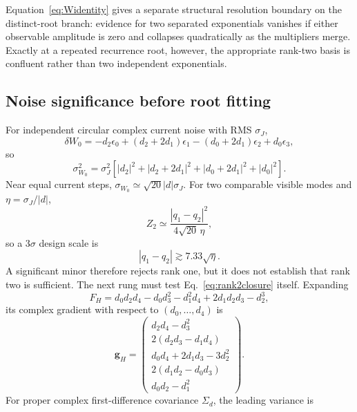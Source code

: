 \documentclass[11pt]{article}
\begin{document}
Equation~\eqref{eq:Widentity} gives a separate structural resolution boundary on the distinct-root branch: evidence for two separated exponentials vanishes if either observable amplitude is zero and collapses quadratically as the multipliers merge. Exactly at a repeated recurrence root, however, the appropriate rank-two basis is confluent rather than two independent exponentials.

\subsection{Noise significance before root fitting}

For independent circular complex current noise with RMS $\sigma_J$,
\begin{equation}
\delta W_0
=-d_2\epsilon_0+(d_2+2d_1)\epsilon_1
-(d_0+2d_1)\epsilon_2+d_0\epsilon_3,
\end{equation}
so
\begin{equation}
\boxed{
\sigma_{W_0}^2=\sigma_J^2\left[
|d_2|^2+|d_2+2d_1|^2+|d_0+2d_1|^2+|d_0|^2
\right].}
\label{eq:Wnoise}
\end{equation}
Near equal current steps, $\sigma_{W_0}\simeq\sqrt{20}|d|\sigma_J$. For two comparable visible modes and $\eta=\sigma_J/|d|$,
\begin{equation}
Z_2\simeq\frac{|q_1-q_2|^2}{4\sqrt{20}\,\eta},
\end{equation}
so a $3\sigma$ design scale is
\begin{equation}
\boxed{|q_1-q_2|\gtrsim7.33\sqrt{\eta}.}
\label{eq:twores}
\end{equation}
A significant minor therefore rejects rank one, but it does not establish that rank two is sufficient. The next rung must test Eq.~\eqref{eq:rank2closure} itself. Expanding
\begin{equation}
F_H=d_0d_2d_4-d_0d_3^2-d_1^2d_4+2d_1d_2d_3-d_2^3,
\end{equation}
its complex gradient with respect to $(d_0,\ldots,d_4)$ is
\begin{equation}
\mathbf g_H=
\begin{pmatrix}
d_2d_4-d_3^2\\
2(d_2d_3-d_1d_4)\\
d_0d_4+2d_1d_3-3d_2^2\\
2(d_1d_2-d_0d_3)\\
d_0d_2-d_1^2
\end{pmatrix}.
\label{eq:hankel_det_gradient}
\end{equation}
For proper complex first-difference covariance $\Sigma_d$, the leading variance is
\end{document}
